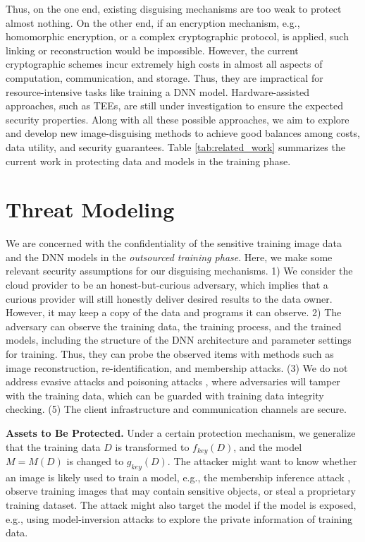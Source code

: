 \documentclass[conference]{IEEEtran}
\begin{document}
Thus, on the one end, existing disguising mechanisms are too weak to protect almost nothing. On the other end, if an encryption mechanism, e.g., homomorphic encryption, or a complex cryptographic protocol, is applied, such linking or reconstruction would be impossible. However, the current cryptographic schemes incur extremely high costs in almost all aspects of computation, communication, and storage. Thus, they are impractical for resource-intensive tasks like training a DNN model. Hardware-assisted approaches, such as TEEs, are still under investigation to ensure the expected security properties. Along with all these possible approaches, we aim to explore and develop new image-disguising methods to achieve good balances among costs, data utility, and security guarantees. Table \ref{tab:related_work} summarizes the current work in protecting data and models in the training phase. 


\section{Threat Modeling} 
We are concerned with the confidentiality of the sensitive training image data and the DNN models in the \emph{outsourced training phase}. Here, we make some relevant security assumptions for our disguising mechanisms. 1) We consider the cloud provider to be an honest-but-curious adversary, which implies that a curious provider will still honestly deliver desired results to the data owner. However, it may keep a copy of the data and programs it can observe. 2) The adversary can observe the training data, the training process, and the trained models, including the structure of the DNN architecture and parameter settings for training. Thus, they can probe the observed items with methods such as image reconstruction, re-identification, and membership attacks. (3) We do not address evasive attacks and poisoning attacks \cite{chakraborty18,raff19}, where adversaries will tamper with the training data, which can be guarded with training data integrity checking. (5) The client infrastructure and communication channels are secure. 

\textbf{Assets to Be Protected.} Under a certain protection mechanism, we generalize that the training data $D$ is transformed to $f_{key}(D)$, and the model $M=M(D)$ is changed to $g_{key}(D)$. The attacker might want to know whether an image is likely used to train a model, e.g., the membership inference attack \cite{shokri16}, observe training images that may contain sensitive objects, or steal a proprietary training dataset. The attack might also target the model if the model is exposed, e.g., using model-inversion attacks \cite{fredrikson15} to explore the private information of training data. 
\end{document}
